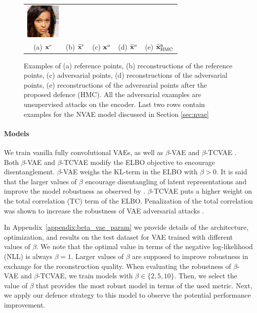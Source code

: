 \begin{figure}
\begin{tabular}{ccccc}
        \includegraphics[width=0.1\linewidth]{pics/3_adv_att/celeba_adv_rec_hmc_2.png}\\
        (a) ${\mathbf{x}}^r$ & (b) $\widetilde{{\mathbf{x}}}^r$ & (c) ${\mathbf{x}}^a$ & (d) $\widetilde{{\mathbf{x}}}^a$ & (e) $\widetilde{{\mathbf{x}}}^\text{a}_{\text{HMC}}$ \\
    \end{tabular}
    \caption{Examples of (a) reference points, (b) reconstructions of the reference points, (c) adversarial points, (d) reconstructions of the adversarial points, (e) reconstructions of the adversarial points after the proposed defence (HMC). All the adversarial examples are unsupervised attacks on the encoder. Last two rows contain examples for the NVAE model discussed in Section \protect\ref{sec:nvae}}
    \label{fig:adversarial_examples}
    \vspace*{\baselineskip}
\end{figure}


\paragraph{Models}
We train vanilla fully convolutional VAEs, as well as $\beta$-VAE \cite{higgins2016beta} and $\beta$-TCVAE \cite{chen2018isolating, kim2018disentangling}. Both $\beta$-VAE and $\beta$-TCVAE modify the ELBO objective to encourage disentanglement. $\beta$-VAE weighs the KL-term in the ELBO with $\beta > 0$. It is said that the larger values of $\beta$ encourage disentangling of latent representations \cite{chen2018isolating} and improve the model robustness as observed by \citet{camuto2021towards}. $\beta$-TCVAE puts a higher weight on the total correlation (TC) term of the ELBO. Penalization of the total correlation was shown to increase the robustness of VAE adversarial attacks \cite{Willetts2019-mu}.

In Appendix~\ref{appendix:beta_vae_param} we provide details of the architecture, optimization, and results on the test dataset for VAE trained with different values of $\beta$. 
We note that the optimal value in terms of the negative log-likelihood (NLL) is always $\beta=1$. Larger values of $\beta$ are supposed to improve robustness in exchange for the reconstruction quality. When evaluating the robustness of $\beta$-VAE and $\beta$-TCVAE, we train models with $\beta \in \{2, 5, 10\}$. Then, we select the value of $\beta$ that provides the most robust model in terms of the used metric. Next, we apply our defence strategy to this model to observe the potential performance improvement. 


